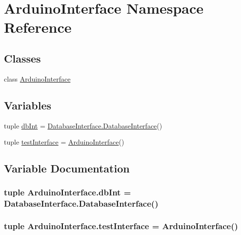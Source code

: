 \hypertarget{namespace_arduino_interface}{\section{Arduino\-Interface Namespace Reference}
\label{namespace_arduino_interface}
}
\subsection*{Classes}
\begin{DoxyCompactItemize}
\item 
class \hyperlink{class_arduino_interface_1_1_arduino_interface}{Arduino\-Interface}
\end{DoxyCompactItemize}
\subsection*{Variables}
\begin{DoxyCompactItemize}
\item 
tuple \hyperlink{namespace_arduino_interface_acabd8a3b260b261f4316302aedc34679}{db\-Int} = \hyperlink{class_database_interface_1_1_database_interface}{Database\-Interface.\-Database\-Interface}()
\item 
tuple \hyperlink{namespace_arduino_interface_a755427af9eca690b97c53bf47381365a}{test\-Interface} = \hyperlink{class_arduino_interface_1_1_arduino_interface}{Arduino\-Interface}()
\end{DoxyCompactItemize}


\subsection{Variable Documentation}
\hypertarget{namespace_arduino_interface_acabd8a3b260b261f4316302aedc34679}{
\subsubsection[{db\-Int}]{\setlength{\rightskip}{0pt plus 5cm}tuple {\bf Arduino\-Interface.\-db\-Int} = {\bf Database\-Interface.\-Database\-Interface}()}}\label{namespace_arduino_interface_acabd8a3b260b261f4316302aedc34679}
\hypertarget{namespace_arduino_interface_a755427af9eca690b97c53bf47381365a}{
\subsubsection[{test\-Interface}]{\setlength{\rightskip}{0pt plus 5cm}tuple {\bf Arduino\-Interface.\-test\-Interface} = {\bf Arduino\-Interface}()}}\label{namespace_arduino_interface_a755427af9eca690b97c53bf47381365a}
